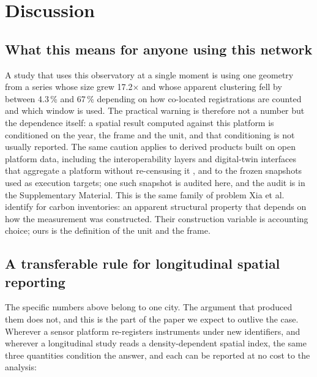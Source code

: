 \documentclass{article}
\newcommand{\growth}{17.2}
\begin{document}
\section{Discussion}
\label{sec:discussion}

\subsection{What this means for anyone using this network}
\label{sec:disc-longitudinal}

A study that uses this observatory at a single moment is using one geometry from a series whose
size grew \growth$\times$ and whose apparent clustering fell by between 4.3\,\% and 67\,\%
depending on how co-located registrations are counted and which window is used. The practical
warning is therefore not a number but the dependence itself: a spatial result computed against
this platform is conditioned on the year, the frame and the unit, and that conditioning is not
usually reported. The same caution applies to derived products built on open platform data,
including the interoperability layers and digital-twin interfaces that aggregate a platform
without re-censusing it \cite{anthony2024enabling}, and to the frozen snapshots used as
execution targets; one such snapshot is audited here, and the audit is in the Supplementary
Material. This is the same family of problem Xia et
al.~\cite{xia2026measurement} identify for carbon inventories: an apparent structural property
that depends on how the measurement was constructed. Their construction variable is accounting
choice; ours is the definition of the unit and the frame.

\subsection{A transferable rule for longitudinal spatial reporting}
\label{sec:disc-transfer}

The specific numbers above belong to one city. The argument that produced them does not, and
this is the part of the paper we expect to outlive the case. Wherever a sensor platform
re-registers instruments under new identifiers, and wherever a longitudinal study reads a
density-dependent spatial index, the same three quantities condition the answer, and each can be
reported at no cost to the analysis:
\end{document}
